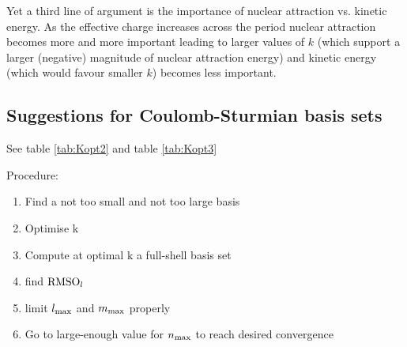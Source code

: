Yet a third line of argument is the importance of nuclear attraction
vs. kinetic energy.
As the effective charge increases across the period
nuclear attraction becomes more and more important leading to larger values of $k$
(which support a larger (negative) magnitude of nuclear attraction energy)
and kinetic energy (which would favour smaller $k$) becomes less important.

\subsection{Suggestions for Coulomb-Sturmian basis sets}



See table \vref{tab:Kopt2} and table \vref{tab:Kopt3} %








Procedure:
\begin{enumerate}
	\item Find a not too small and not too large basis
	\item Optimise k
	\item Compute at optimal k a full-shell basis set
	\item find $\text{RMSO}_l$
	\item limit $l_\text{max}$ and $m_\text{max}$ properly
	\item Go to large-enough value for $n_\text{max}$ to reach desired convergence
\end{enumerate}

